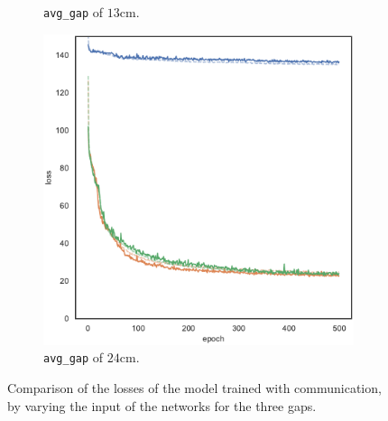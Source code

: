 \begin{figure}[!htb]
\begin{center}
\begin{subfigure}[h]{0.32\textwidth}
			\caption{\texttt{avg\_gap} of $13$\gls{cm}.}
		\end{subfigure}
		\hfill
		\begin{subfigure}[h]{0.32\textwidth}
			\includegraphics[width=\textwidth]{contents/images/task1-comm/loss-communication-gap_24@copy}
			\caption{\texttt{avg\_gap} of $24$\gls{cm}.}
		\end{subfigure}
	\end{center}
	\vspace{-0.5cm}
	\caption[Losses summary of the first set of experiments 
	(communication).]{Comparison of the losses of the model trained with 
		communication, by varying the input of the networks for the three gaps.}
	\label{fig:commloss81324}
\end{figure}

